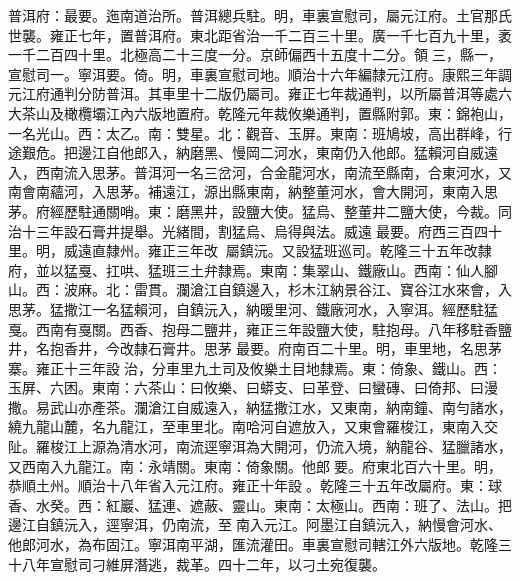 \begin{pinyinscope}
普洱府：最要。迤南道治所。普洱總兵駐。明，車裏宣慰司，屬元江府。土官那氏世襲。雍正七年，置普洱府。東北距省治一千二百三十里。廣一千七百九十里，袤一千二百四十里。北極高二十三度一分。京師偏西十五度十二分。領三，縣一，宣慰司一。寧洱要。倚。明，車裏宣慰司地。順治十六年編隸元江府。康熙三年調元江府通判分防普洱。其車里十二版仍屬司。雍正七年裁通判，以所屬普洱等處六大茶山及橄欖壩江內六版地置府。乾隆元年裁攸樂通判，置縣附郭。東：錦袍山，一名光山。西：太乙。南：雙星。北：觀音、玉屏。東南：班鳩坡，高出群峰，行途艱危。把邊江自他郎入，納磨黑、慢岡二河水，東南仍入他郎。猛賴河自威遠入，西南流入思茅。普洱河一名三岔河，合金龍河水，南流至縣南，合東河水，又南會南蘊河，入思茅。補遠江，源出縣東南，納整董河水，會大開河，東南入思茅。府經歷駐通關哨。東：磨黑井，設鹽大使。猛烏、整董井二鹽大使，今裁。同治十三年設石膏井提舉。光緒間，割猛烏、烏得與法。威遠最要。府西三百四十里。明，威遠直隸州。雍正三年改，屬鎮沅。又設猛班巡司。乾隆三十五年改隸府，並以猛戛、扛哄、猛班三土弁隸焉。東南：集翠山、鐵廠山。西南：仙人腳山。西：波麻。北：雷貫。瀾滄江自鎮邊入，杉木江納景谷江、寶谷江水來會，入思茅。猛撒江一名猛賴河，自鎮沅入，納暖里河、鐵廠河水，入寧洱。經歷駐猛戛。西南有戛關。西香、抱母二鹽井，雍正三年設鹽大使，駐抱母。八年移駐香鹽井，名抱香井，今改隸石膏井。思茅最要。府南百二十里。明，車里地，名思茅寨。雍正十三年設治，分車里九土司及攸樂土目地隸焉。東：倚象、鐵山。西：玉屏、六困。東南：六茶山：曰攸樂、曰蟒支、曰革登、曰蠻磚、曰倚邦、曰漫撒。易武山亦產茶。瀾滄江自威遠入，納猛撒江水，又東南，納南鐘、南勻諸水，繞九龍山麓，名九龍江，至車里北。南哈河自遮放入，又東會羅梭江，東南入交阯。羅梭江上源為清水河，南流逕寧洱為大開河，仍流入境，納龍谷、猛臘諸水，又西南入九龍江。南：永靖關。東南：倚象關。他郎要。府東北百六十里。明，恭順土州。順治十八年省入元江府。雍正十年設。乾隆三十五年改屬府。東：球香、水癸。西：紅巖、猛連、遮蔽、靈山。東南：太極山。西南：班了、法山。把邊江自鎮沅入，逕寧洱，仍南流，至南入元江。阿墨江自鎮沅入，納慢會河水、他郎河水，為布固江。寧洱南平湖，匯流灌田。車裏宣慰司轄江外六版地。乾隆三十八年宣慰司刁維屏潛逃，裁革。四十二年，以刁土宛復襲。


\end{pinyinscope}
